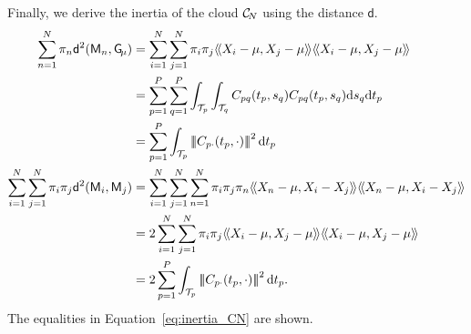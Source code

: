 Finally, we derive the inertia of the cloud $\mathcal{C}_{\!N}$ using the distance $\mathsf{d}$.
\begin{align}
\sum_{n = 1}^N \pi_n \mathsf{d}^2(\pfea{M}_n, \Gfea) &= \sum_{i = 1}^N \sum_{j = 1}^N \pi_i \pi_j \inH{X_i - \mu}{X_j - \mu}\inH{X_i - \mu}{X_j - \mu} \\
&= \sum_{p = 1}^P \sum_{q = 1}^P \int_{\TT{p}} \int_{\TT{q}} C_{pq}(t_p, s_q)C_{pq}(t_p, s_q) \dd s_q \dd t_p \\
&= \sum_{p = 1}^P \int_{\TT{p}} \normH{C_{p \cdot}(t_p, \cdot)}^2 \dd t_p\\
\sum_{i = 1}^N \sum_{j = 1}^N \pi_i \pi_j \mathsf{d}^2(\pfea{M}_i, \pfea{M}_j) &= \sum_{i = 1}^N \sum_{j = 1}^N \sum_{n = 1}^N \pi_i \pi_j \pi_n \inH{X_n - \mu}{X_i - X_j}\inH{X_n - \mu}{X_i - X_j} \\
&= 2\sum_{i = 1}^N \sum_{j = 1}^N \pi_i \pi_j \inH{X_i - \mu}{X_j - \mu}\inH{X_i - \mu}{X_j - \mu} \\
&= 2\sum_{p = 1}^P \int_{\TT{p}} \normH{C_{p \cdot}(t_p, \cdot)}^2 \dd t_p.
\end{align}
The equalities in Equation~\eqref{eq:inertia_CN} are shown.

